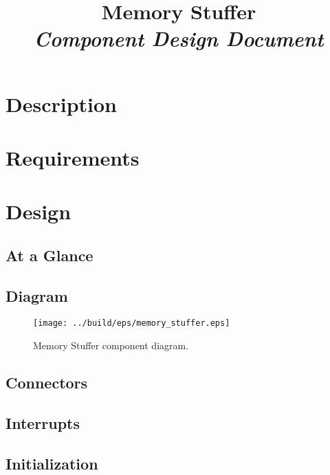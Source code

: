 



\title{\textbf{Memory Stuffer} \\
\large\textit{Component Design Document}}
\date{}
\maketitle

\section{Description}


\section{Requirements}


\section{Design}

\subsection{At a Glance}


\subsection{Diagram}
\begin{figure}[H]
  \texttt{[image: ../build/eps/memory\_stuffer.eps]}
  \caption{Memory Stuffer component diagram.}
\end{figure}

\subsection{Connectors}


\subsection{Interrupts}



\subsection{Initialization}


